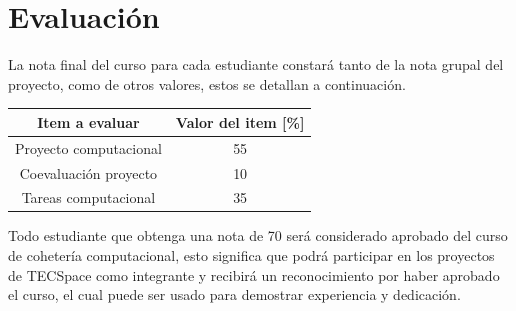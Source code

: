 ﻿\documentclass[letterpaper]{article}
\begin{document}
\clearpage

\section{Evaluación}
La nota final del curso para cada estudiante constará tanto de la nota
grupal del proyecto, como de otros valores, estos se detallan a continuación.
\begin{table}[h]
    \centering
    \begin{tabular}{cc}
        \toprule
            Item a evaluar & Valor del item [\%] \\
        \midrule
            Proyecto computacional & 55 \\
            Coevaluación proyecto  & 10 \\
            Tareas computacional   & 35 \\
        \bottomrule
    \end{tabular}
\end{table}

Todo estudiante que obtenga una nota de 70 será considerado aprobado del curso de cohetería
computacional, esto significa que podrá participar en los proyectos de TECSpace como integrante y
recibirá un reconocimiento por haber aprobado el curso, el cual puede ser usado para demostrar
experiencia y dedicación.
\end{document}
